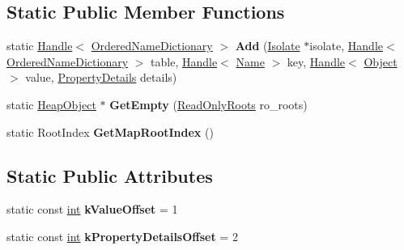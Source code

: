 \subsection*{Static Public Member Functions}
\begin{DoxyCompactItemize}
\item 
\mbox{\label{classv8_1_1internal_1_1OrderedNameDictionary_ab8bd3b54ef09872a5f3ab07ec7a5b12d}} 
static \mbox{\hyperlink{classv8_1_1internal_1_1Handle}{Handle}}$<$ \mbox{\hyperlink{classv8_1_1internal_1_1OrderedNameDictionary}{Ordered\+Name\+Dictionary}} $>$ {\bfseries Add} (\mbox{\hyperlink{classv8_1_1internal_1_1Isolate}{Isolate}} $\ast$isolate, \mbox{\hyperlink{classv8_1_1internal_1_1Handle}{Handle}}$<$ \mbox{\hyperlink{classv8_1_1internal_1_1OrderedNameDictionary}{Ordered\+Name\+Dictionary}} $>$ table, \mbox{\hyperlink{classv8_1_1internal_1_1Handle}{Handle}}$<$ \mbox{\hyperlink{classv8_1_1internal_1_1Name}{Name}} $>$ key, \mbox{\hyperlink{classv8_1_1internal_1_1Handle}{Handle}}$<$ \mbox{\hyperlink{classv8_1_1internal_1_1Object}{Object}} $>$ value, \mbox{\hyperlink{classv8_1_1internal_1_1PropertyDetails}{Property\+Details}} details)
\item 
\mbox{\label{classv8_1_1internal_1_1OrderedNameDictionary_aecf5488ee0c4151b85568e19d36a50fe}} 
static \mbox{\hyperlink{classv8_1_1internal_1_1HeapObject}{Heap\+Object}} $\ast$ {\bfseries Get\+Empty} (\mbox{\hyperlink{classv8_1_1internal_1_1ReadOnlyRoots}{Read\+Only\+Roots}} ro\+\_\+roots)
\item 
\mbox{\label{classv8_1_1internal_1_1OrderedNameDictionary_add1b57419b8d36b15810d421a9c83b43}} 
static Root\+Index {\bfseries Get\+Map\+Root\+Index} ()
\end{DoxyCompactItemize}
\subsection*{Static Public Attributes}
\begin{DoxyCompactItemize}
\item 
\mbox{\label{classv8_1_1internal_1_1OrderedNameDictionary_ae5e95e204107e4beb54afad3d5522818}} 
static const \mbox{\hyperlink{classint}{int}} {\bfseries k\+Value\+Offset} = 1
\item 
\mbox{\label{classv8_1_1internal_1_1OrderedNameDictionary_ab48ec89cacde13e1d9dc599285654f49}} 
static const \mbox{\hyperlink{classint}{int}} {\bfseries k\+Property\+Details\+Offset} = 2
\end{DoxyCompactItemize}
